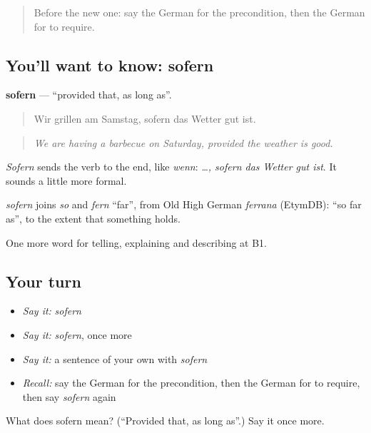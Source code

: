 \begin{quote}
Before the new one: say the German for the precondition, then the German for to require.
\end{quote}

\subsection*{You'll want to know: sofern}
\textbf{sofern} — \textquotedblleft{}provided that, as long as\textquotedblright{}.

\begin{quote}
Wir grillen am Samstag, sofern das Wetter gut ist.
\end{quote}

\begin{quote}
\emph{We are having a barbecue on Saturday, provided the weather is good.}
\end{quote}

\emph{Sofern} sends the verb to the end, like \emph{wenn}: \emph{…, sofern das Wetter gut ist}. It sounds a little more formal.

\begin{cousinweb}
\emph{sofern} joins \emph{so} and \emph{fern} \textquotedblleft{}far\textquotedblright{}, from Old High German \emph{ferrana} (EtymDB): \textquotedblleft{}so far as\textquotedblright{}, to the extent that something holds.
\end{cousinweb}

\begin{grammarlens}[title={What you've built}]
One more word for telling, explaining and describing at B1.
\end{grammarlens}

\subsection*{Your turn}
\begin{itemize}
\raggedright
  \item \emph{Say it:} \emph{sofern}
  \item \emph{Say it:} \emph{sofern}, once more
  \item \emph{Say it:} a sentence of your own with \emph{sofern}
  \item \emph{Recall:} say the German for the precondition, then the German for to require, then say \emph{sofern} again
\end{itemize}

\begin{tcolorbox}[breakable,colback=teal!4,colframe=teal!35!black,title={Before you move on}]
What does sofern mean? (\textquotedblleft{}Provided that, as long as\textquotedblright{}.) Say it once more.
\end{tcolorbox}
